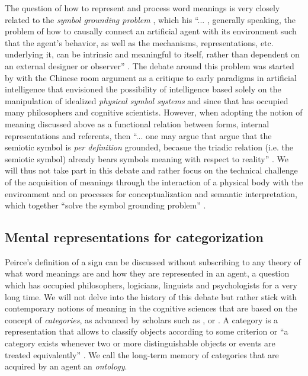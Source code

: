 The question of how to represent and process word meanings is very
closely related to the \emph{symbol grounding problem}
\citep{harnad90symbolgrounding}, which his ``... , generally speaking,
the problem of how to causally connect an artificial agent with its
environment such that the agent's behavior, as well as the mechanisms,
representations, etc. underlying it, can be intrinsic and meaningful
to itself, rather than dependent on an external designer or observer''
\citep[p.~177]{ziemke99rethinking}. The debate around this problem was
started by \cite{searle80minds} with the Chinese room argument as a
critique to early paradigms in artificial intelligence that envisioned
the possibility of intelligence based solely on the manipulation of
idealized \emph{physical symbol systems}
\citep{newell76computer,newell80physical} and since that has occupied
many philosophers and cognitive scientists. However, when adopting the
notion of meaning discussed above as a functional relation between
forms, internal representations and referents, then ``... one may
argue that argue that the semiotic symbol is \emph{per definition}
grounded, becasue the triadic relation (i.e. the semiotic symbol)
already bears symbols meaning with respect to reality''
\citep[p.~434]{vogt02physical}. We will thus not take part in this
debate and rather focus on the technical challenge of the acquisition
of meanings through the interaction of a physical body with the
environment and on processes for conceptualization and semantic
interpretation, which together ``solve the symbol grounding problem''
\citealp*{steels08symbol-grounding,steels07semiotic}.



\subsection{Mental representations for categorization}
\label{s:mental-representations-for-categorizations}

Peirce's definition of a sign can be discussed without subscribing to
any theory of what word meanings are and how they are represented in
an agent, a question which has occupied philosophers, logicians,
linguists and psychologists for a very long time. We will not delve
into the history of this debate but rather stick with contemporary
notions of meaning in the cognitive sciences that are based on the
concept of \emph{categories}, as advanced by scholars such as
\cite{lakoff87woman}, \cite{harnad87categorial} or
\cite{barsalou99perceptual}. A category is a representation that
allows to classify objects according to some criterion or ``a category
exists whenever two or more distinguishable objects or events are
treated equivalently'' \citep[p. 89]{mervis81categorization}. We call
the long-term memory of categories that are acquired by an agent an
\emph{ontology}.


